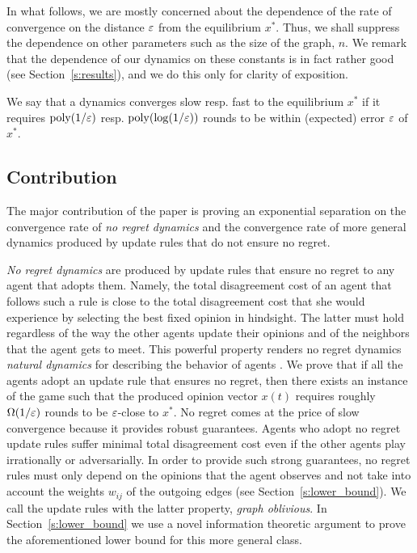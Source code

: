 In what follows, we are mostly concerned about the dependence of
the rate of convergence on the distance $\varepsilon$ from the equilibrium $x^*$. 
Thus, we shall
suppress the dependence on other parameters such as the size of
the graph, $n$.  We remark that the dependence of our dynamics on these
constants is in fact rather good (see Section~\ref{s:results}), and we do
this only for clarity of exposition.

\begin{definition}[Informal]\label{d:convergence_rate}
  We say that a dynamics converges slow resp. fast to the equilibrium $x^*$ if
  it requires $\mathrm{poly}(1/\varepsilon)$ resp. $\mathrm{poly}(\log(1/\varepsilon))$ rounds to
  be within (expected) error $\varepsilon$ of $x^*$.
\end{definition}

\subsection{Contribution}
The major contribution of the paper is proving an exponential separation on
the convergence rate of \emph{no regret dynamics} and the convergence rate of
more general dynamics produced by update rules that do not ensure no regret.

\emph{No regret dynamics} are produced by update rules that
ensure no regret to any agent that adopts them.
Namely, the total disagreement cost of an agent that follows such a
rule is close to the total disagreement cost that she would experience by
selecting the best fixed opinion in hindsight. The latter must hold
regardless of the way the other agents update their opinions
and of the neighbors that the agent gets to meet.
This powerful property renders no regret dynamics \emph{natural dynamics}
for describing the behavior of agents \cite{CL03,EMN09,KPT11,SALS15}.
We prove that if all the agents adopt an update rule that ensures no regret,
then there exists an instance of the game such that the produced opinion
vector $x(t)$ requires roughly $\Omega(1/\varepsilon)$ rounds to
be $\varepsilon$-close to $x^*$. No regret comes at the price of slow convergence
because it provides robust guarantees.
Agents who adopt no regret update rules suffer minimal total disagreement
cost even if the other agents play irrationally or adversarially.
In order to provide such strong guarantees, no regret rules must only depend on
the opinions that the agent observes and not take into account
the weights $w_{ij}$ of the outgoing edges (see Section~\ref{s:lower_bound}).
We call the update rules with the latter property, \emph{graph oblivious}.
In Section~\ref{s:lower_bound} we use a novel information theoretic argument
to prove the aforementioned lower bound for this more general class.

